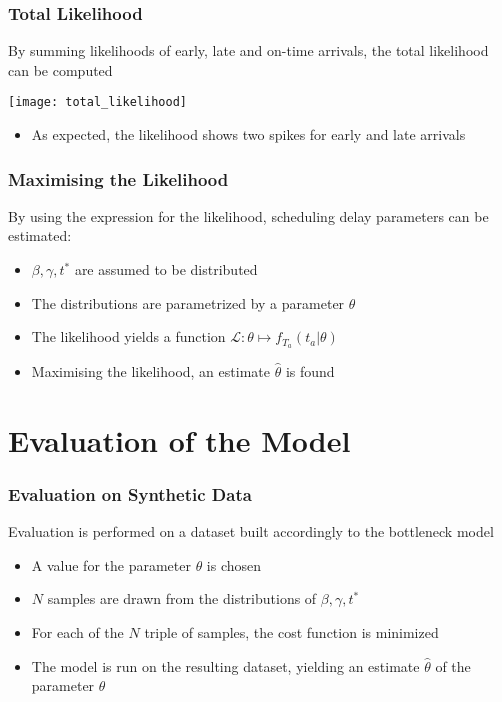 \documentclass[hyperref={pdfpagelabels=false}]{beamer}
\begin{document}
\begin{frame}
  \frametitle{Total Likelihood}
  By summing likelihoods of early, late and on-time arrivals, the total likelihood can be computed
  \begin{center}
    \texttt{[image: total\_likelihood]}
  \end{center}
  \begin{itemize}
  \item As expected, the likelihood shows two spikes for early and late arrivals
  \end{itemize}
\end{frame}

\begin{frame}
  \frametitle{Maximising the Likelihood}
  By using the expression for the likelihood,
  scheduling delay parameters can be estimated:
  \begin{itemize}
  \item<2-> \(\beta, \gamma, t^*\) are assumed to be distributed
  \item<2-> The distributions are parametrized by a parameter \(\theta\)
  \item<3-> The likelihood yields a function \(\mathcal{L} : \theta \mapsto f_{T_a}(t_a | \theta)\)
  \item<4-> Maximising the likelihood, an estimate \(\hat{\theta}\) is found
  \end{itemize}
\end{frame}

\section{Evaluation of the Model}

\begin{frame}
  \tableofcontents[currentsection]
\end{frame}

\begin{frame}
  \frametitle{Evaluation on Synthetic Data}
  Evaluation is performed on a dataset built accordingly to the bottleneck model
  \begin{itemize}
  \item A value for the parameter \(\theta\) is chosen
  \item<2-> \(N\) samples are drawn from the distributions of \(\beta, \gamma, t^*\)
  \item<3-> For each of the \(N\) triple of samples, the cost function is minimized
  \item<4-> The model is run on the resulting dataset, yielding an estimate \(\hat{\theta}\) of the parameter \(\theta\)
  \end{itemize}
\end{frame}
\end{document}
